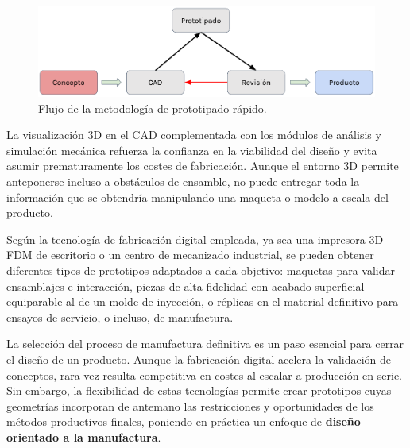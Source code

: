 \begin{figure}[h!]
    \centering
    \includegraphics[width=1.0\linewidth]{imgs/prototip.png}
    \caption{Flujo de la metodología de prototipado rápido.}
    \label{propro}
\end{figure}

La visualización 3D en el CAD complementada con los módulos de análisis y simulación mecánica refuerza la confianza en la viabilidad del diseño y evita asumir prematuramente los costes de fabricación. Aunque el entorno 3D permite anteponerse incluso a obstáculos de ensamble, no puede entregar toda la información que se obtendría manipulando una maqueta o modelo a escala del producto.

Según la tecnología de fabricación digital empleada, ya sea una impresora 3D FDM de escritorio o un centro de mecanizado industrial, se pueden obtener diferentes tipos de prototipos adaptados a cada objetivo: maquetas para validar ensamblajes e interacción, piezas de alta fidelidad con acabado superficial equiparable al de un molde de inyección, o réplicas en el material definitivo para ensayos de servicio, o incluso, de manufactura.

La selección del proceso de manufactura definitiva es un paso esencial para cerrar el diseño de un producto. Aunque la fabricación digital acelera la validación de conceptos, rara vez resulta competitiva en costes al escalar a producción en serie. Sin embargo, la flexibilidad de estas tecnologías permite crear prototipos cuyas geometrías incorporan de antemano las restricciones y oportunidades de los métodos productivos finales, poniendo en práctica un enfoque de \textbf{diseño orientado a la manufactura}.